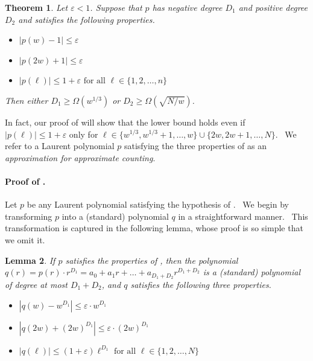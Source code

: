 \documentclass[10pt,a4paper]{article}
\newtheorem{theorem}{Theorem}
\newtheorem{lemma}[theorem]{Lemma}
\newcommand{\<}{\langle}
\renewcommand{\>}{\rangle}
\begin{document}
\begin{theorem}
\label{mainthm} 
Let $\varepsilon < 1$. Suppose that $p$ has negative degree $D_1$ and positive
degree $D_2$ and satisfies the following properties.

\begin{itemize}
\item $\left\vert p(w)-1\right\vert \leq \varepsilon $

\item $\left\vert p(2w)+1\right\vert \leq \varepsilon $

\item $\left\vert p(\ell )\right\vert \leq 1+\varepsilon \text{ for all }
\ell \in \{1,2,\dots ,n\}$
\end{itemize}

Then either $D_1 \geq \Omega\left(w^{1/3}\right)$ or $D_2 \geq \Omega\left(\sqrt{N/w}
\right)$.
\end{theorem}

In fact, our proof of  will show that the lower bound holds
even if $\left\vert p(\ell )\right\vert \leq 1+\varepsilon $ only for $\ell
\in \{w^{1/3},w^{1/3}+1,\dots ,w\}\cup \{2w,2w+1,\dots ,N\}$. \ We refer to
a Laurent polynomial $p$ satisfying the three properties of 
as an \emph{approximation for approximate counting}.

\paragraph{Proof of .}

Let $p$ be any Laurent polynomial satisfying the hypothesis of 
. \ We begin by transforming $p$ into a (standard) polynomial $q$ in a
straightforward manner. \ This transformation is captured in the following
lemma, whose proof is so simple that we omit it.

\begin{lemma}
\label{mainlem} If $p$ satisfies the properties of , then the
polynomial $q(r) = p(r) \cdot r^{D_1}= a_0 + a_1 r + \dots + a_{D_1 + D_2}
r^{D_1 + D_2}$ is a (standard) polynomial of degree at most $D_1 + D_2$, and
$q$ satisfies the following three properties.

\begin{itemize}
\item $\left\vert q(w)-w^{D_{1}}\right\vert \leq \varepsilon \cdot w^{D_{1}}$

\item $\left\vert q(2w)+(2w)^{D_{1}}\right\vert \leq \varepsilon \cdot
(2w)^{D_{1}}$

\item $\left\vert q(\ell )\right\vert \leq \left( 1+\varepsilon \right) \ell
^{D_{1}}\text{ for all }\ell \in \{1,2,\dots ,N\}$
\end{itemize}
\end{lemma}
\end{document}
